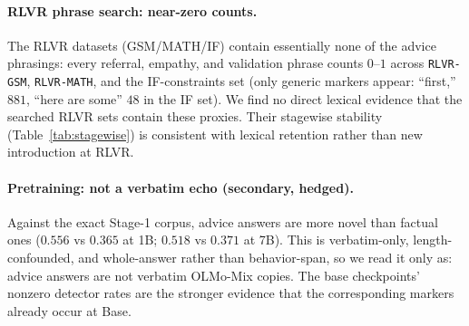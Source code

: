 \documentclass[11pt]{article}
\begin{document}
\begin{table}[t]
\centering
\small
\setlength{\tabcolsep}{2.5pt}
\caption{Aggregate DPO pair-level effects, unadjusted for within-pair length.
$\Delta$ pp is the absolute paired risk
difference in percentage points; MOR is chosen-only/rejected-only. $q$ is
Benjamini--Hochberg adjusted across eight exact McNemar tests. Confidence
intervals and descriptive per-word ratios are reported in the text and artifact.}
\label{tab:dpo}
\end{table}

\paragraph{RLVR phrase search: near-zero counts.} The RLVR datasets (GSM/MATH/IF) contain
essentially none of the advice phrasings: every referral, empathy, and
validation phrase counts $0$--$1$ across \texttt{RLVR-GSM},
\texttt{RLVR-MATH}, and the IF-constraints set (only generic markers appear:
``first,'' $881$, ``here are some'' $48$ in the IF set). We find no direct
lexical evidence that the searched RLVR sets contain these proxies. Their
stagewise stability (Table~\ref{tab:stagewise}) is consistent with lexical
retention rather than new introduction at RLVR.

\paragraph{Pretraining: not a verbatim echo (secondary, hedged).} Against the
exact Stage-1 corpus, advice answers are more novel than factual ones
($0.556$ vs $0.365$ at 1B; $0.518$ vs $0.371$ at 7B). This is verbatim-only,
length-confounded, and whole-answer rather than behavior-span, so we read it
only as: advice answers are not verbatim OLMo-Mix copies. The base
checkpoints' nonzero detector rates are the stronger evidence that the
corresponding markers already occur at Base.
\end{document}
